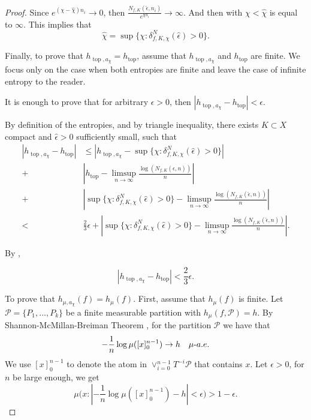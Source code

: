 \documentclass[oneside]{amsart}
\theoremstyle{plain}
\theoremstyle{definition}
\newcommand{\<}{\langle}
\renewcommand{\>}{\rangle}
\renewcommand{\P}{\mathcal{P}}
\newcommand{\e}{\epsilon}
\newcommand{\topo}{\operatorname{top}}
\renewcommand{\|}{|\!|} %
\begin{document}
\begin{proof}
Since $e^{(\chi-\hat{\chi})n_i} \to 0$, then $\frac{N_{f,K}(\hat{\e},n_i)}{e^{\chi n_i}} \to \infty.$ And then  with $\chi<\hat{\chi}$ is equal to $\infty$.
This implies that 
\begin{equation}
    \hat{\chi} = \sup \{\chi: \delta^N_{f,K,\chi}(\hat{\e})>0\}.
\end{equation}



Finally, to prove that $h_{\topo,a_\chi} = h_{\topo}$, assume that $h_{\topo,a_\chi}$ and $ h_{\topo}$ are finite. We focus only on the case when both entropies are finite and leave the case of infinite entropy to the reader. 

It is enough to prove that for arbitrary $\e > 0$, then 
$\left| h_{\topo,a_{\chi}} - h_{\topo} \right| < \e.$

By definition of the entropies, and by triangle inequality, there exists $K \subset X$ compact and $\hat{\e}>0$ sufficiently small, such that
\begin{equation*}
    \begin{split}
        \left| h_{\topo,a_{\chi}} - h_{\topo} \right|& \leq 
         \left| h_{\topo,a_{\chi}} - \sup \{\chi: \delta^N_{f,K,\chi}(\hat{\e})>0\} \right| \\
          +  &  \left| h_{\topo} - \limsup_{n \to \infty} \frac{\log(N_{f,K}(\hat{\e},n))}{n} \right| \\
          +  &  \left| \sup \{\chi: \delta^N_{f,K,\chi}(\hat{\e})>0\} - \limsup_{n \to \infty} \frac{\log(N_{f,K}(\hat{\e},n))}{n}   \right| \\ 
          < & \frac{2}{3}\e + \left| \sup \{\chi: \delta^N_{f,K,\chi}(\hat{\e})>0\} - \limsup_{n \to \infty} \frac{\log(N_{f,K}(\hat{\e},n))}{n}   \right|.
    \end{split}
\end{equation*}

By ,

\begin{equation*}
    \left| h_{\topo,a_{\chi}} - h_{\topo} \right| < \frac{2}{3}\e.
\end{equation*}

To prove that $h_{\mu,a_{\chi}}(f)=h_{\mu}(f)$. First, assume that $h_{\mu}(f)$ is finite. Let  $\mathcal{P}=\{P_1,\dots,P_k\}$ be a finite measurable partition with $h_\mu(f,\P)=h$. By Shannon-McMillan-Breiman Theorem \cite[Theorem 9.3.1]{Viana_Oliveira_2016}, for the partition $\mathcal{P}$ we have that
\begin{equation*}
-\frac{1}{n} \log\mu([x]_0^{n-1})\rightarrow{h} \quad \mu{\text -a.e.}
\end{equation*}
 We use $[x]_0^{n-1}$ to denote the atom in $\displaystyle\vee_{i=0}^{n-1}T^{-i}\P$ that contains $x$. Let  $\e>0$, for $n$ be large enough, we get 
\begin{equation*}
    \mu\Big(x:\left|-\frac{1}{n} \log\mu([x]_0^{n-1})-h\right|<\epsilon\Big)>1-\epsilon.
\end{equation*}


\end{proof}
\end{document}
